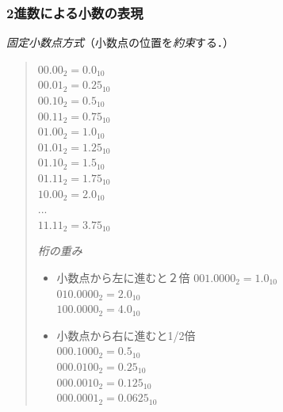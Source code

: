 \documentclass{beamer}                 %
\begin{document}
\begin{frame}
  \frametitle{2進数による小数の表現}
  \emph{固定小数点方式}（小数点の位置を\emph{約束}する．）
  \vfill
  \begin{quote}
    \begin{minipage}{0.4\columnwidth}
      $00.00_2 = 0.0_{10}$  \\
      $00.01_2 = 0.25_{10}$  \\
      $00.10_2 = 0.5_{10}$  \\
      $00.11_2 = 0.75_{10}$  \\
      $01.00_2 = 1.0_{10}$  \\
      $01.01_2 = 1.25_{10}$  \\
      $01.10_2 = 1.5_{10}$  \\
      $01.11_2 = 1.75_{10}$  \\
      $10.00_2 = 2.0_{10}$  \\
      ...\\
      $11.11_2 = 3.75_{10}$
    \end{minipage}
    \begin{minipage}{0.5\columnwidth}
      \emph{桁の重み}
      \begin{itemize}
      \item 小数点から左に進むと２倍
        $001.0000_2 = 1.0_{10}$ \\
        $010.0000_2 = 2.0_{10}$ \\
        $100.0000_2 = 4.0_{10}$ \\
        \vspace{1ex}
      \item 小数点から右に進むと1/2倍\\
        $000.1000_2 = 0.5_{10}$ \\
        $000.0100_2 = 0.25_{10}$ \\
        $000.0010_2 = 0.125_{10}$ \\
        $000.0001_2 = 0.0625_{10}$
      \end{itemize}
    \end{minipage}
  \end{quote}
\end{frame}
\end{document}
